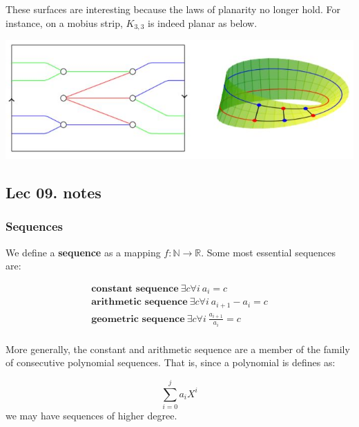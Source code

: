 \documentclass{article}
\theoremstyle{definition}
\numberwithin{equation}{subsection}
\numberwithin{remark}{subsection}
\begin{document}
These surfaces are interesting because the laws of planarity no longer hold. For instance, on a mobius strip, $K_{3,3}$ is indeed planar as below. 

 \begin{tcolorbox}[drop shadow, title=($K_{3,3}$ has become planar),lower separated=true]
    \centering
        \includegraphics[scale = 0.9,valign=t]{epflSemesterOne/advancedComputation/figures/mobiusk3.JPG}
\end{tcolorbox}

\subsection{Lec 09. notes}
\subsubsection{Sequences}
We define a \textbf{sequence} as a mapping $f: \mathbb{N} \to \mathbb{R}$. Some most essential sequences are:

\begin{align*}
    \textbf{constant sequence} \ \exists c \forall i \ a_{i} = c\\
    \textbf{arithmetic sequence} \ \exists c \forall i \ a_{i+1} - a_{i}  = c\\
    \textbf{geometric sequence} \ \exists c \forall i \ \frac{a_{i+1}}{a_{i}}= c
\end{align*}
\\
More generally, the constant and arithmetic sequence are a member of the family of consecutive polynomial sequences. That is, since a polynomial is defines as:

$$\sum_{i=0}^{j} a_{i}X^{i}$$ we may have sequences of higher degree. 
\end{document}
